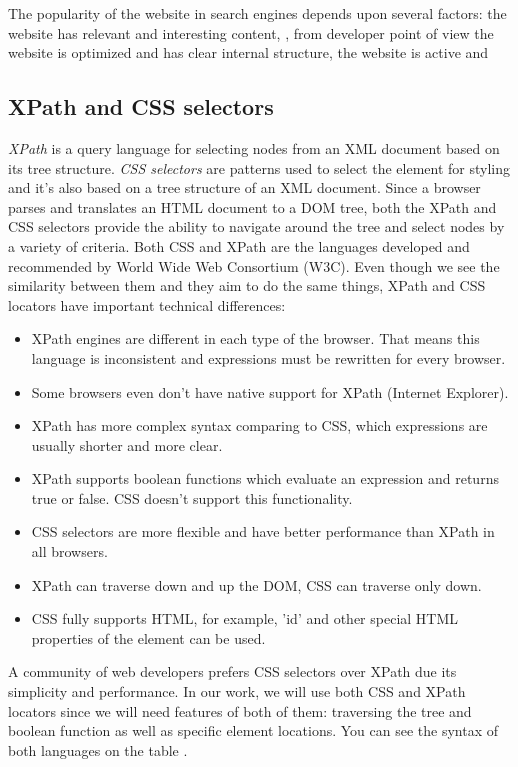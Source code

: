 The popularity of the website in search engines depends upon several factors: the website has relevant and interesting content, , from developer point of view the website is optimized and has clear internal structure, the website is active and 

\subsection{XPath and CSS selectors}

\textit{XPath} is a query language for selecting nodes from an XML document based on its tree structure. \textit{CSS selectors} are patterns used to select the element for styling and it's also based on a tree structure of an XML document. Since a browser parses and translates an HTML document to a DOM tree, both the XPath and CSS selectors provide the ability to navigate around the tree and select nodes by a variety of criteria. Both CSS and XPath are the languages developed and recommended by World Wide Web Consortium (W3C). Even though we see the similarity between them and they aim to do the same things, XPath and CSS locators have important technical differences:
\begin{itemize}
    \item XPath engines are different in each type of the browser. That means this language is inconsistent and expressions must be rewritten for every browser.  
    \item Some browsers even don't have native support for XPath (Internet Explorer).
    \item XPath has more complex syntax comparing to CSS, which expressions are usually shorter and more clear.
    \item XPath supports boolean functions which evaluate an expression and returns true or false. CSS doesn't support this functionality.
    \item CSS selectors are more flexible and have better performance than XPath in all browsers.
    \item XPath can traverse down and up the DOM, CSS can traverse only down.
    \item CSS fully supports HTML, for example, 'id' and other special HTML properties of the element can be used.
\end{itemize}

A community of web developers prefers CSS selectors over XPath due its simplicity and performance. In our work, we will use both CSS and XPath locators since we will need features of both of them: traversing the tree and boolean function as well as specific element locations. You can see the syntax of both languages on the table .\\

